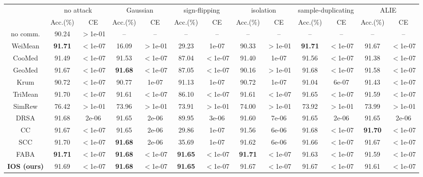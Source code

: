 \begin{tabular}{c|cc|cc|cc|cc|cc|cc}
\hline\hline
\multirow{2}{*}{}&\multicolumn{2}{c|}{no attack}&\multicolumn{2}{c|}{Gaussian}&\multicolumn{2}{c|}{sign-flipping}&\multicolumn{2}{c|}{isolation}&\multicolumn{2}{c|}{sample-duplicating}&\multicolumn{2}{c}{ALIE}\\
& Acc.(\%) & CE & Acc.(\%) & CE & Acc.(\%) & CE & Acc.(\%) & CE & Acc.(\%) & CE & Acc.(\%) & CE \\
\hline
no comm. & 90.24 & $>$1e-01 & -- & --  & -- & --  & -- & --  & -- & --  & -- & -- \\
\hline
WeiMean & \textbf{91.71} & {$<$1e-07} & {16.09} & {$>$1e-01} & {29.23} & {1e-07} & {90.33} & {$>$1e-01} & \textbf{91.71} & {$<$1e-07} & {91.67} & {$<$1e-07}\\
CooMed & {91.49} & {$<$1e-07} & {91.53} & {$<$1e-07} & {87.04} & {$<$1e-07} & {91.40} & {1e-07} & {91.56} & {$<$1e-07} & {91.38} & {$<$1e-07}\\
GeoMed & {91.67} & {$<$1e-07} & \textbf{91.68} & {$<$1e-07} & {87.05} & {$<$1e-07} & {90.16} & {$>$1e-01} & {91.68} & {$<$1e-07} & {91.58} & {$<$1e-07}\\
Krum & {90.72} & {$<$1e-07} & {90.77} & {1e-07} & {91.13} & {1e-07} & {90.72} & {1e-07} & {91.04} & {6e-07} & {91.43} & {$<$1e-07}\\
TriMean & {91.70} & {$<$1e-07} & {91.61} & {$<$1e-07} & {86.10} & {$<$1e-07} & {91.61} & {$<$1e-07} & {91.65} & {$<$1e-07} & {91.59} & {$<$1e-07}\\
SimRew & {76.42} & {$>$1e-01} & {73.96} & {$>$1e-01} & {73.91} & {$>$1e-01} & {74.00} & {$>$1e-01} & {73.92} & {$>$1e-01} & {73.99} & {$>$1e-01}\\
DRSA & {91.68} & {2e-06} & {91.65} & {2e-06} & {89.95} & {3e-06} & {91.60} & {7e-06} & {91.65} & {2e-06} & {91.65} & {2e-06}\\
CC & {91.67} & {$<$1e-07} & {91.65} & {2e-06} & {29.86} & {1e-07} & {91.56} & {6e-06} & {91.68} & {$<$1e-07} & \textbf{91.70} & {$<$1e-07}\\
SCC & {91.70} & {$<$1e-07} & \textbf{91.68} & {2e-06} & {35.69} & {1e-07} & {91.62} & {6e-06} & {91.66} & {$<$1e-07} & {91.67} & {$<$1e-07}\\
FABA & \textbf{91.71} & {$<$1e-07} & \textbf{91.68} & {$<$1e-07} & \textbf{91.65} & {$<$1e-07} & \textbf{91.71} & {$<$1e-07} & {91.63} & {$<$1e-07} & {91.59} & {$<$1e-07}\\
\textbf{IOS (ours)} & {91.69} & {$<$1e-07} & \textbf{91.68} & {$<$1e-07} & \textbf{91.65} & {$<$1e-07} & {91.67} & {$<$1e-07} & {91.67} & {$<$1e-07} & {91.61} & {$<$1e-07}\\
\hline\hline
\end{tabular}
